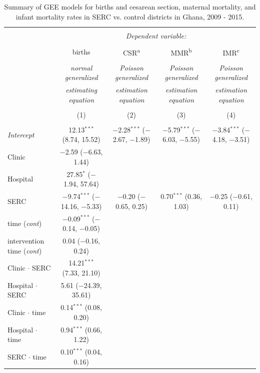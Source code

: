 \documentclass[10pt]{article}
\begin{document}
\begin{table} \centering 
  \caption{Summary of GEE models for births and cesarean section, maternal mortality, and infant mortality rates in SERC vs. control districts in Ghana, 2009 - 2015.} 
  \label{} 
\begin{tabular}{@{\extracolsep{0pt}}lcccc} 
\\[-1.8ex]\hline 
\hline \\[-1.8ex] 
 & \multicolumn{4}{c}{\textit{Dependent variable:}} \\ 
\cline{2-5} 
\\[-1.8ex] & births & CSR\textsuperscript{a} & MMR\textsuperscript{b} & IMR\textsuperscript{c} \\ 
\\[-1.8ex] & \textit{normal generalized} & \textit{Poisson generalized} & \textit{Poisson generalized} & \textit{Poisson generalized} \\ 
 & \textit{estimating equation} & \textit{estimation equation} & \textit{estimation equation} & \textit{estimation equation} \\ 
\\[-1.8ex] & (1) & (2) & (3) & (4)\\ 
\hline \\[-1.8ex] 
 \textit{Intercept} & 12.13$^{***}$ (8.74, 15.52) & $-$2.28$^{***}$ ($-$2.67, $-$1.89) & $-$5.79$^{***}$ ($-$6.03, $-$5.55) & $-$3.84$^{***}$ ($-$4.18, $-$3.51) \\ 
  Clinic & $-$2.59 ($-$6.63, 1.44) &  &  &  \\ 
  Hospital & 27.85$^{*}$ ($-$1.94, 57.64) &  &  &  \\ 
  SERC & $-$9.74$^{***}$ ($-$14.16, $-$5.33) & $-$0.20 ($-$0.65, 0.25) & 0.70$^{***}$ (0.36, 1.03) & $-$0.25 ($-$0.61, 0.11) \\ 
  time (\textit{cont}) & $-$0.09$^{***}$ ($-$0.14, $-$0.05) &  &  &  \\ 
  intervention time (\textit{cont}) & 0.04 ($-$0.16, 0.24) &  &  &  \\ 
  Clinic $\cdot$ SERC & 14.21$^{***}$ (7.33, 21.10) &  &  &  \\ 
  Hospital $\cdot$ SERC & 5.61 ($-$24.39, 35.61) &  &  &  \\ 
  Clinic $\cdot$ time & 0.14$^{***}$ (0.08, 0.20) &  &  &  \\ 
  Hospital $\cdot$ time & 0.94$^{***}$ (0.66, 1.22) &  &  &  \\ 
  SERC $\cdot$ time & 0.10$^{***}$ (0.04, 0.16) &  &  &  \\ 

\end{tabular}
\end{table}
\end{document}
